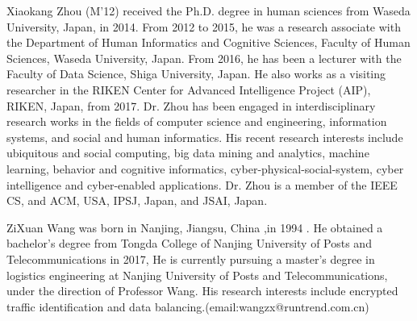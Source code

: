 \documentclass[conference]{IEEEtran}
\begin{document}
\begin{IEEEbiography}{Xiaokang Zhou}
(M’12) received the Ph.D. degree in human sciences from Waseda University, Japan, in 2014. From 2012 to 2015, he was a research associate with the Department of Human Informatics and Cognitive Sciences, Faculty of Human Sciences, Waseda University, Japan. From 2016, he has been a lecturer with the Faculty of Data Science, Shiga University, Japan. He also works as a visiting researcher in the RIKEN Center for Advanced Intelligence Project (AIP), RIKEN, Japan, from 2017. Dr. Zhou has been engaged in interdisciplinary research works in the fields of computer science and engineering, information systems, and social and human informatics. His recent research interests include ubiquitous and social computing, big data mining and analytics, machine learning, behavior and cognitive informatics, cyber-physical-social-system, cyber intelligence and cyber-enabled applications. Dr. Zhou is a member of the IEEE CS, and ACM, USA, IPSJ, Japan, and JSAI, Japan.

\end{IEEEbiography}

\vspace{-30ex}
\begin{IEEEbiography}{ZiXuan Wang}
was born in Nanjing, Jiangsu, China ,in 1994 . He obtained a bachelor's degree from Tongda College of Nanjing University of Posts and Telecommunications in 2017, He is currently pursuing a master's degree in logistics engineering at Nanjing University of Posts and Telecommunications, under the direction of Professor Wang. His research interests include encrypted traffic identification and data balancing.(email:wangzx@runtrend.com.cn)

\end{IEEEbiography}
\end{document}
